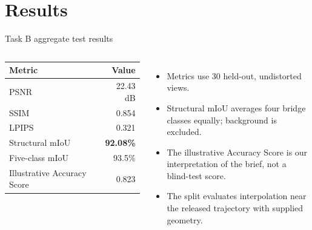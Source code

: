 \documentclass[aspectratio=169,10pt]{beamer}
\begin{document}
\section{Results}
\begin{frame}{Task B aggregate test results}
\begin{columns}[T,onlytextwidth]
\begin{tabular}{lr}\toprule Metric&Value\\\midrule PSNR&22.43 dB\\SSIM&0.854\\LPIPS&0.321\\Structural mIoU&\textbf{92.08\%}\\Five-class mIoU&93.5\%\\Illustrative Accuracy Score&0.823\\\bottomrule\end{tabular}
\begin{itemize}\tightitems
\item Metrics use 30 held-out, undistorted views.
\item Structural mIoU averages four bridge classes equally; background is excluded.
\item The illustrative Accuracy Score is our interpretation of the brief, not a blind-test score.
\item The split evaluates interpolation near the released trajectory with supplied geometry.
\end{itemize}\end{columns}
\end{frame}
\end{document}
